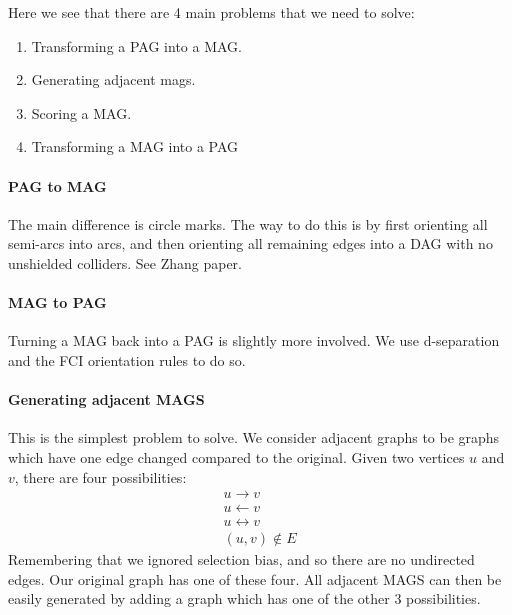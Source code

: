 \documentclass[
]{article}
\providecommand{\tightlist}{%
  \setlength{\itemsep}{0pt}\setlength{\parskip}{0pt}}
\begin{document}
Here we see that there are 4 main problems that we need to solve:

\begin{enumerate}
\def\labelenumi{\arabic{enumi}.}
\tightlist
\item
  Transforming a PAG into a MAG.
\item
  Generating adjacent mags.
\item
  Scoring a MAG.
\item
  Transforming a MAG into a PAG
\end{enumerate}

\hypertarget{pag-to-mag}{%
\paragraph{PAG to MAG}\label{pag-to-mag}}

The main difference is circle marks. The way to do this is by first
orienting all semi-arcs into arcs, and then orienting all remaining
edges into a DAG with no unshielded colliders. See Zhang paper.

\hypertarget{mag-to-pag}{%
\paragraph{MAG to PAG}\label{mag-to-pag}}

Turning a MAG back into a PAG is slightly more involved. We use
d-separation and the FCI orientation rules to do so.

\hypertarget{generating-adjacent-mags}{%
\paragraph{Generating adjacent MAGS}\label{generating-adjacent-mags}}

This is the simplest problem to solve. We consider adjacent graphs to be
graphs which have one edge changed compared to the original. Given two
vertices \(u\) and \(v\), there are four possibilities: \begin{align}
  u \rightarrow v \\
  u \leftarrow v \\
  u \leftrightarrow v\\
  (u, v) \notin E
\end{align} Remembering that we ignored selection bias, and so there are
no undirected edges. Our original graph has one of these four. All
adjacent MAGS can then be easily generated by adding a graph which has
one of the other 3 possibilities.
\end{document}
